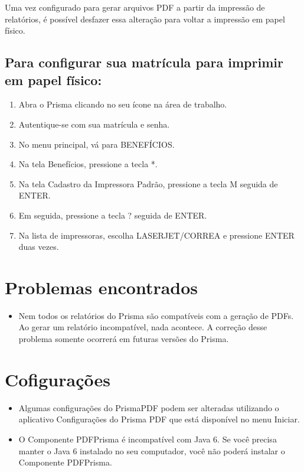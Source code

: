 \documentclass[12pt,a4paper]{article}
\begin{document}
\vspace{0.3cm}
\noindent Uma vez configurado para gerar arquivos PDF a partir da impressão de relatórios, é possível desfazer essa alteração para voltar a impressão em papel físico.

\subsection{Para configurar sua matrícula para imprimir em papel físico:}
\begin{enumerate}
  \item Abra o Prisma clicando no seu ícone na área de trabalho.
  \item Autentique-se com sua matrícula e senha.
  \item No menu principal, vá para BENEFÍCIOS.
  \item Na tela Benefícios, pressione a tecla *.
  \item Na tela Cadastro da Impressora Padrão, pressione a tecla M seguida de ENTER.
  \item Em seguida, pressione a tecla ? seguida de ENTER.
  \item Na lista de impressoras, escolha LASERJET/CORREA e pressione ENTER duas vezes.
\end{enumerate}

\section{Problemas encontrados}
\begin{itemize}
  \item Nem todos os relatórios do Prisma são compatíveis com a geração de PDFs. Ao gerar um relatório incompatível, nada acontece. A correção desse problema somente ocorrerá em futuras versões do Prisma.
\end{itemize}

\section{Cofigurações}

\begin{itemize}
  \item Algumas configurações do PrismaPDF podem ser alteradas utilizando o aplicativo Configurações do Prisma PDF que está disponível no menu Iniciar.
  \item O Componente PDFPrisma é incompatível com Java 6. Se você precisa manter o Java 6 instalado no seu computador, você não poderá instalar o Componente PDFPrisma.
\end{itemize}
\end{document}
